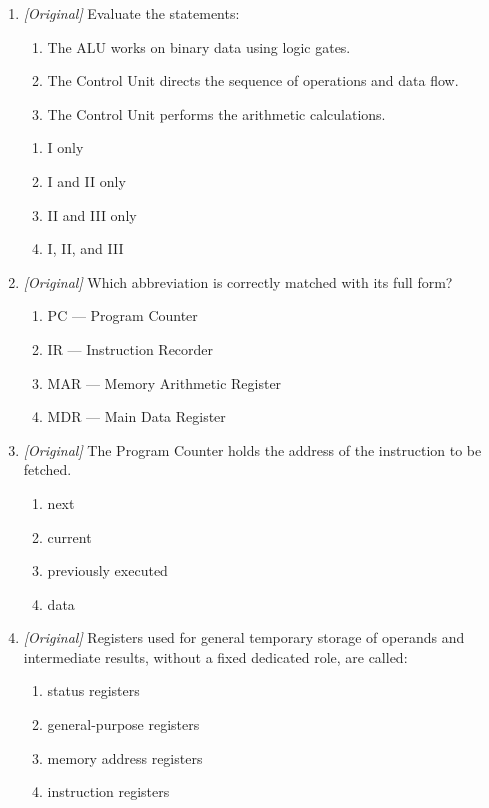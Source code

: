 \documentclass[11pt]{article}
\begin{document}
\begin{enumerate}[label=\textbf{Q\arabic*.}, leftmargin=*]
\item \textit{[Original]} Evaluate the statements:
  \begin{enumerate}[label=\Roman*.]
    \item The ALU works on binary data using logic gates.
    \item The Control Unit directs the sequence of operations and data flow.
    \item The Control Unit performs the arithmetic calculations.
  \end{enumerate}
  \begin{enumerate}[label=\Alph*.]
    \item I only
    \item I and II only
    \item II and III only
    \item I, II, and III
  \end{enumerate}
\item \textit{[Original]} Which abbreviation is correctly matched with its
  full form?
  \begin{enumerate}[label=\Alph*.]
    \item PC --- Program Counter
    \item IR --- Instruction Recorder
    \item MAR --- Memory Arithmetic Register
    \item MDR --- Main Data Register
  \end{enumerate}
\item \textit{[Original]} The Program Counter holds the address of the
  \underline{\hspace{2.2cm}} instruction to be fetched.
  \begin{enumerate}[label=\Alph*.]
    \item next
    \item current
    \item previously executed
    \item data
  \end{enumerate}
\item \textit{[Original]} Registers used for general temporary storage of
  operands and intermediate results, without a fixed dedicated role, are
  called:
  \begin{enumerate}[label=\Alph*.]
    \item status registers
    \item general-purpose registers
    \item memory address registers
    \item instruction registers

\end{enumerate}
\end{enumerate}
\end{document}
